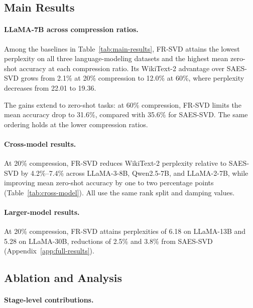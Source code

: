 \documentclass[11pt]{article}
\begin{document}
\subsection{Main Results}\label{sec:main-results-llama7b}



\paragraph{LLaMA-7B across compression ratios.}

Among the baselines in Table~\ref{tab:main-results}, FR-SVD attains the lowest perplexity on all three language-modeling datasets and the highest mean zero-shot accuracy at each compression ratio. Its WikiText-2 advantage over SAES-SVD grows from 2.1\% at 20\% compression to 12.0\% at 60\%, where perplexity decreases from 22.01 to 19.36.

The gains extend to zero-shot tasks: at 60\% compression, FR-SVD limits the mean accuracy drop to 31.6\%, compared with 35.6\% for SAES-SVD. The same ordering holds at the lower compression ratios.

\paragraph{Cross-model results.}

At 20\% compression, FR-SVD reduces WikiText-2 perplexity relative to SAES-SVD by 4.2\%--7.4\% across LLaMA-3-8B, Qwen2.5-7B, and LLaMA-2-7B, while improving mean zero-shot accuracy by one to two percentage points (Table~\ref{tab:cross-model}). All use the same rank split and damping values.


\paragraph{Larger-model results.}
At 20\% compression, FR-SVD attains perplexities of 6.18 on LLaMA-13B and 5.28 on LLaMA-30B, reductions of 2.5\% and 3.8\% from SAES-SVD (Appendix~\ref{app:full-results}).

\subsection{Ablation and Analysis}\label{sec:ablation}

\paragraph{Stage-level contributions.}
\end{document}
